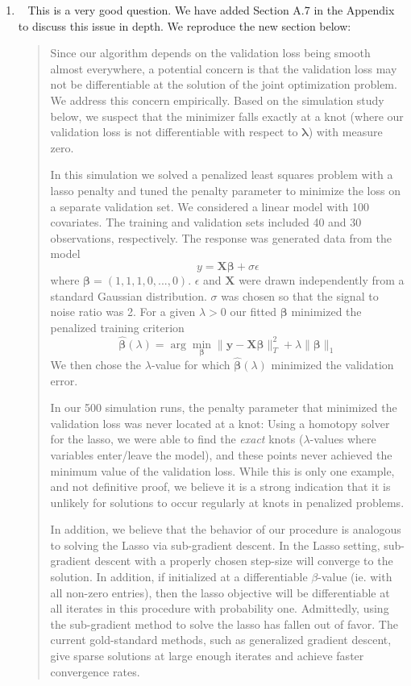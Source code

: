 \documentclass[]{article}
\newcommand{\reply}{\item[]\ }
\begin{document}
\begin{enumerate}
		\reply
		This is a very good question. We have added Section A.7 in the Appendix to discuss this issue in depth. We reproduce the new section below:
		
		\begin{quote}
		Since our algorithm depends on the validation loss being smooth almost everywhere, a potential concern is that the validation loss may not be differentiable at the solution of the joint optimization problem. We address this concern empirically. Based on the simulation study below, we suspect that the minimizer falls exactly at a knot (where our validation loss is not differentiable with respect to $\boldsymbol{\lambda}$) with measure zero. 
		
		In this simulation we solved a penalized least squares problem with a lasso penalty and tuned the penalty parameter to minimize the loss on a separate validation set. We considered a linear model with 100 covariates. The training and validation sets included 40 and 30 observations, respectively. The response was generated data from the model
		$$
		y = \boldsymbol{X}\boldsymbol{\beta} + \sigma\epsilon
		$$
		where $\boldsymbol{\beta} = (1, 1, 1, 0, ..., 0)$. $\epsilon$ and $\boldsymbol{X}$ were drawn independently from a standard Gaussian distribution. $\sigma$ was chosen so that the signal to noise ratio was 2. For a given $\lambda>0$ our fitted $\boldsymbol{\beta}$ minimized the penalized training criterion
		$$
		\boldsymbol{\hat{\beta}}(\lambda) = \arg\min_{\boldsymbol{\beta}} \| \boldsymbol{y} - \boldsymbol{X}\boldsymbol{\beta} \|_T^2 + \lambda \|\boldsymbol{\beta}\|_1
		$$
		We then chose the $\lambda$-value for which $\boldsymbol{\hat{\beta}}(\lambda)$ minimized the validation error.
		
		In our 500 simulation runs, the penalty parameter that minimized the validation loss was never located at a knot: Using a homotopy solver for the lasso, we were able to find the \emph{exact} knots ($\lambda$-values where variables enter/leave the model), and these points never achieved the minimum value of the validation loss. While this is only one example, and not definitive proof, we believe it is a strong indication that it is unlikely for solutions to occur regularly at knots in penalized problems.
		
		In addition, we believe that the behavior of our procedure is analogous to solving the Lasso via sub-gradient descent. In the Lasso setting, sub-gradient descent with a properly chosen step-size will converge to the solution. In addition, if initialized at a differentiable $\beta$-value (ie. with all non-zero entries), then the lasso objective will be differentiable at all iterates in this procedure with probability one. Admittedly, using the sub-gradient method to solve the lasso has fallen out of favor. The current gold-standard methods, such as generalized gradient descent, give sparse solutions at large enough iterates and achieve faster convergence rates.
		\end{quote}
		

\end{enumerate}
\end{document}
